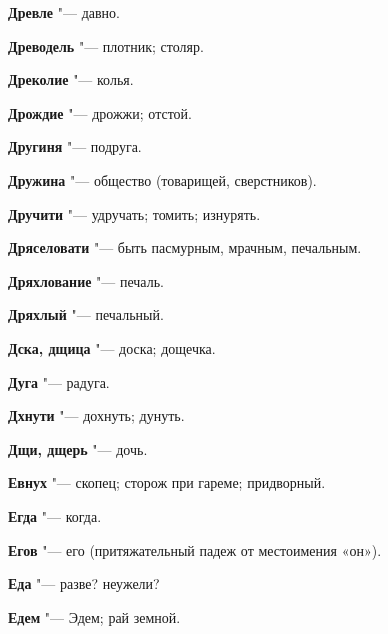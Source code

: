 \begin{mymulticols}{2}
\noindent\textbf{Древле} "--- давно. 




\noindent\textbf{Древодель} "--- плотник; столяр. 




\noindent\textbf{Дреколие} "--- колья. 




\noindent\textbf{Дрождие} "--- дрожжи; отстой. 




\noindent\textbf{Другиня} "--- подруга. 




\noindent\textbf{Дружина} "--- общество (товарищей, сверстников). 




\noindent\textbf{Дручити} "--- удручать; томить; изнурять. 




\noindent\textbf{Дряселовати} "--- быть пасмурным, мрачным, печальным. 




\noindent\textbf{Дряхлование} "--- печаль. 




\noindent\textbf{Дряхлый} "--- печальный. 




\noindent\textbf{Дска, дщица} "--- доска; дощечка. 




\noindent\textbf{Дуга} "--- радуга. 




\noindent\textbf{Дхнути} "--- дохнуть; дунуть. 




\noindent\textbf{Дщи, дщерь} "--- дочь. 









\noindent\textbf{Евнух} "--- скопец; сторож при гареме; придворный. 




\noindent\textbf{Егда} "--- когда. 




\noindent\textbf{Егов} "--- его (притяжательный падеж от местоимения «он»). 




\noindent\textbf{Еда} "--- разве? неужели? 




\noindent\textbf{Едем} "--- Эдем; рай земной. 





\end{mymulticols}
